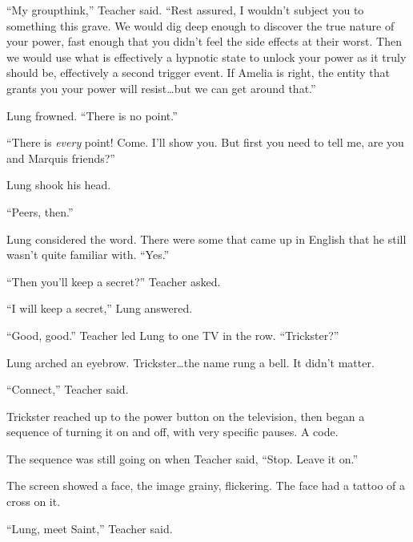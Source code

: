 ``My groupthink,'' Teacher said.  ``Rest assured, I wouldn't subject you to something this grave.  We would dig deep enough to discover the true nature of your power, fast enough that you didn't feel the side effects at their worst.  Then we would use what is effectively a hypnotic state to unlock your power as it truly should be, effectively a second trigger event.  If Amelia is right, the entity that grants you your power will resist\ldots but we can get around that.''



Lung frowned.  ``There is no point.''



``There is \emph{every} point!  Come.  I'll show you.  But first you need to tell me, are you and Marquis friends?''



Lung shook his head.



``Peers, then.''



Lung considered the word.  There were some that came up in English that he still wasn't quite familiar with.  ``Yes.''



``Then you'll keep a secret?'' Teacher asked.



``I will keep a secret,'' Lung answered.



``Good, good.''  Teacher led Lung to one TV in the row.  ``Trickster?''



Lung arched an eyebrow.  Trickster\ldots the name rung a bell.  It didn't matter.



``Connect,'' Teacher said.



Trickster reached up to the power button on the television, then began a sequence of turning it on and off, with very specific pauses.  A code.



The sequence was still going on when Teacher said, ``Stop.  Leave it on.''



The screen showed a face, the image grainy, flickering.  The face had a tattoo of a cross on it.



``Lung, meet Saint,'' Teacher said.



